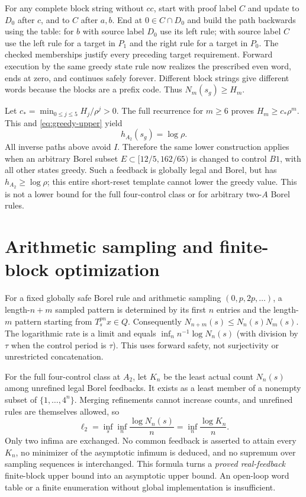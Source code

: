 \documentclass[11pt,reqno]{amsart}
\numberwithin{equation}{section}
\theoremstyle{definition}
\begin{document}
For any complete block string without $cc$, start with proof label
$C$ and update to $D_0$ after $c$, and to $C$ after $a,b$.
End at $0\in C\cap D_0$ and build the path backwards using
the table: for $b$ with source label $D_0$ use its left rule;
with source label $C$ use the left rule for a target in $P_1$
and the right rule for a target in $P_0$. The checked memberships
justify every preceding target requirement. Forward execution by
the same greedy state rule now realizes the prescribed even word,
ends at zero, and continues safely forever. Different block strings
give different words because the blocks are a prefix code. Thus
$N_m(s_g)\ge H_m$.

Let $c_* =\min_{0\le j\le5}H_j/\rho^j>0$. The full recurrence
for $m\ge6$ proves $H_m\ge c_*\rho^m$. This and
\eqref{eq:greedy-upper} yield
\begin{equation}\label{eq:greedy-exact}
 h_{A_2}(s_g)=\log\rho.
\end{equation}
All inverse paths above avoid $I$. Therefore the same lower
construction applies when an arbitrary Borel subset
$E\subset[12/5,162/65)$ is changed to control $B1$, with all
other states greedy. Such a feedback is globally legal and Borel,
but has $h_{A_2}\ge\log\rho$; this entire short-reset template
cannot lower the greedy value. This is not a lower bound for the
full four-control class or for arbitrary two-$A$ Borel rules.

\section{Arithmetic sampling and finite-block optimization}
\label{app:finiteblock}
For a fixed globally safe Borel rule and arithmetic sampling
$(0,p,2p,\ldots)$, a length-$n+m$ sampled pattern is determined
by its first $n$ entries and the length-$m$ pattern starting from
$T_s^{pn}x\in Q$. Consequently $N_{n+m}(s)\le N_n(s)N_m(s)$.
The logarithmic rate is a limit and equals
$\inf_n n^{-1}\log N_n(s)$ (with division by $\tau$ when
the control period is $\tau$). This uses forward safety, not
surjectivity or unrestricted concatenation.

For the full four-control class at $A_2$, let $K_n$ be the least
actual count $N_n(s)$ among unrefined legal Borel feedbacks.
It exists as a least member of a nonempty subset of
$\{1,\ldots,4^n\}$. Merging refinements cannot increase counts,
and unrefined rules are themselves allowed, so
\begin{equation}\label{eq:finiteblock}
 \ell_2=\inf_s\inf_n\frac{\log N_n(s)}n
 =\inf_n\frac{\log K_n}n.
\end{equation}
Only two infima are exchanged. No common feedback is asserted to
attain every $K_n$, no minimizer of the asymptotic infimum is
deduced, and no supremum over sampling sequences is interchanged.
This formula turns a \emph{proved real-feedback} finite-block
upper bound into an asymptotic upper bound. An open-loop word
table or a finite enumeration without global implementation is
insufficient.
\end{document}
